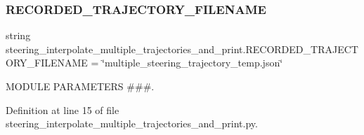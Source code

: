 \subsubsection{\texorpdfstring{RECORDED\_TRAJECTORY\_FILENAME}{RECORDED\_TRAJECTORY\_FILENAME}}
{\footnotesize\ttfamily string steering\+\_\+interpolate\+\_\+multiple\+\_\+trajectories\+\_\+and\+\_\+print.\+R\+E\+C\+O\+R\+D\+E\+D\+\_\+\+T\+R\+A\+J\+E\+C\+T\+O\+R\+Y\+\_\+\+F\+I\+L\+E\+N\+A\+ME = \char`\"{}multiple\+\_\+steering\+\_\+trajectory\+\_\+temp.\+json\char`\"{}}



M\+O\+D\+U\+LE P\+A\+R\+A\+M\+E\+T\+E\+RS \#\#\#. 



Definition at line 15 of file steering\+\_\+interpolate\+\_\+multiple\+\_\+trajectories\+\_\+and\+\_\+print.\+py.

